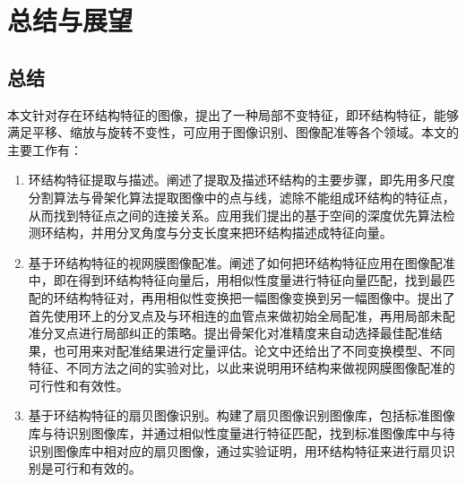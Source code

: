 

\chapter{总结与展望}
\label{cha:intro}

\section{总结}
\label{}
本文针对存在环结构特征的图像，提出了一种局部不变特征，即环结构特征，能够满足平移、缩放与旋转不变性，可应用于图像识别、图像配准等各个领域。本文的主要工作有：
\begin{enumerate}
\item 环结构特征提取与描述。阐述了提取及描述环结构的主要步骤，即先用多尺度分割算法与骨架化算法提取图像中的点与线，滤除不能组成环结构的特征点，从而找到特征点之间的连接关系。应用我们提出的基于空间的深度优先算法检测环结构，并用分叉角度与分支长度来把环结构描述成特征向量。

\item 基于环结构特征的视网膜图像配准。阐述了如何把环结构特征应用在图像配准中，即在得到环结构特征向量后，用相似性度量进行特征向量匹配，找到最匹配的环结构特征对，再用相似性变换把一幅图像变换到另一幅图像中。提出了首先使用环上的分叉点及与环相连的血管点来做初始全局配准，再用局部未配准分叉点进行局部纠正的策略。提出骨架化对准精度来自动选择最佳配准结果，也可用来对配准结果进行定量评估。论文中还给出了不同变换模型、不同特征、不同方法之间的实验对比，以此来说明用环结构来做视网膜图像配准的可行性和有效性。

\item 基于环结构特征的扇贝图像识别。构建了扇贝图像识别图像库，包括标准图像库与待识别图像库，并通过相似性度量进行特征匹配，找到标准图像库中与待识别图像库中相对应的扇贝图像，通过实验证明，用环结构特征来进行扇贝识别是可行和有效的。
\end{enumerate}

